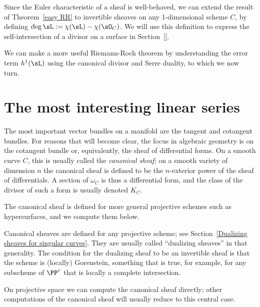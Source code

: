 Since the Euler characteristic of a sheaf is well-behaved, we can extend the result of Theorem~\ref{easy RR} 
to invertible sheaves on any 1-dimensional scheme $C$, by defining $\deg \sL := \chi(\sL) -\chi(\sO_C)$.
We will use this definition to express the self-intersection of a divisor on a surface in Section~\ref{}.

We can make a more useful Riemann-Roch theorem by understanding the error term $h^1(\sL)$ using
the canonical divisor and Serre duality, to which
we now turn.


\section{The most interesting linear series}\label{most interesting}

The most important vector bundles on a manifold are the tangent and cotangent bundles. For reasons that
will become clear, the focus in algebraic geometry is on the cotangent bundle or, equivalently, the sheaf of differential forms. On a smooth curve $C$, this is usually called the \emph{canonical sheaf}; on a smooth
variety of dimension $n$ the canonical sheaf is defined to be the $n$-exterior power of the sheaf of differentials. A section of 
$\omega_C$ is thus a differential form, and the class of the divisor
of such a form is usually denoted $K_C$. 

The canonical sheaf is defined for more general projective schemes such as hypersurfaces, and we compute them below.

\begin{fact}
Canonical sheaves are defined for any projective scheme; see Section~\ref{Dualizing sheaves for singular curves}. 
They are usually called ``dualizing sheaves'' in that generality. The condition for the dualizing sheaf to be an invertible
sheaf is that the scheme is (locally) Gorenstein, something that is true, for example, for any subscheme of $\PP^r$
that is locally a complete intersection.
\end{fact}
 

On projective space we can compute the canonical sheaf directly; other computations of the canonical sheaf will usually reduce to this central case.

